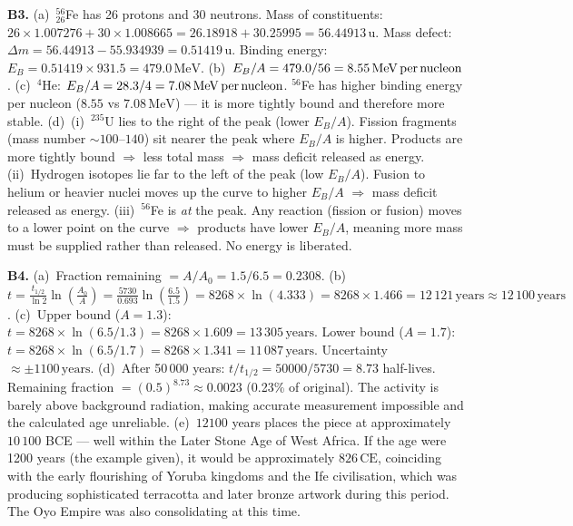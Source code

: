 \textbf{B3.}
(a)~${}^{56}_{26}$Fe has 26 protons and 30 neutrons.
Mass of constituents:
$26\times1.007276+30\times1.008665
=26.18918+30.25995=56.44913\,\text{u}$.
Mass defect:
$\Delta m=56.44913-55.934939=0.51419\,\text{u}$.
Binding energy:
$E_B=0.51419\times931.5=479.0\,\text{MeV}$. \quad
(b)~$E_B/A=479.0/56=8.55\,\text{MeV\,per\,nucleon}$. \quad
(c)~${}^4$He: $E_B/A=28.3/4=7.08\,\text{MeV\,per\,nucleon}$.
${}^{56}$Fe has higher binding energy per nucleon
($8.55$ vs $7.08\,\text{MeV}$) --- it is more tightly
bound and therefore more stable. \quad
(d)~(i)~${}^{235}$U lies to the right of the peak
(lower $E_B/A$). Fission fragments (mass number
$\sim100$--$140$) sit nearer the peak where $E_B/A$
is higher. Products are more tightly bound $\Rightarrow$
less total mass $\Rightarrow$ mass deficit released as
energy.
(ii)~Hydrogen isotopes lie far to the left of the peak
(low $E_B/A$). Fusion to helium or heavier nuclei
moves up the curve to higher $E_B/A$ $\Rightarrow$
mass deficit released as energy.
(iii)~${}^{56}$Fe is \textit{at} the peak. Any
reaction (fission or fusion) moves to a lower point on
the curve $\Rightarrow$ products have lower $E_B/A$,
meaning more mass must be supplied rather than
released. No energy is liberated.

\textbf{B4.}
(a)~Fraction remaining
$=A/A_0=1.5/6.5=0.2308$. \quad
(b)~$t=\frac{t_{1/2}}{\ln2}\ln\!\left(\frac{A_0}{A}\right)
=\frac{5730}{0.693}\ln\!\left(\frac{6.5}{1.5}\right)
=8268\times\ln(4.333)
=8268\times1.466=12\,121\,\text{years}
\approx12\,100\,\text{years}$. \quad
(c)~Upper bound ($A=1.3$): $t=8268\times\ln(6.5/1.3)
=8268\times1.609=13\,305\,\text{years}$.
Lower bound ($A=1.7$): $t=8268\times\ln(6.5/1.7)
=8268\times1.341=11\,087\,\text{years}$.
Uncertainty $\approx\pm1100\,\text{years}$. \quad
(d)~After 50\,000 years: $t/t_{1/2}=50000/5730=8.73$
half-lives. Remaining fraction
$=(0.5)^{8.73}\approx0.0023$ (0.23\% of original).
The activity is barely above background radiation,
making accurate measurement impossible and the
calculated age unreliable. \quad
(e)~$12100$ years places the piece at approximately
$10\,100$ BCE --- well within the Later Stone Age
of West Africa. If the age were 1200 years (the
example given), it would be approximately $826\,\text{CE}$,
coinciding with the early flourishing of Yoruba
kingdoms and the Ife civilisation, which was
producing sophisticated terracotta and later bronze
artwork during this period. The Oyo Empire was also
consolidating at this time.

